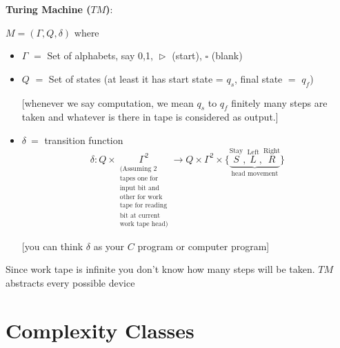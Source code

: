 \documentclass{report}
\begin{document}
\textbf{Turing Machine ($TM$)}: {$M=(\Gamma, Q,\delta)$ where \begin{itemize}
		\item $\Gamma$ $=$ Set of alphabets, say 0,1, $\vartriangleright$ (start), $\square$ (blank)
		\item $Q$ $=$ Set of states (at least it has start state = $q_s$, final state $=$ $q_f$)
		
		[whenever we say computation, we mean $q_s$ to $q_f$ finitely many steps are taken and whatever is there in tape is considered as output.]
		\item $\delta\ =$ transition function$$\delta : Q\times \underset{\substack{  (\text{Assuming 2}\\ \text{tapes one for} \\ \text{input bit and}\\ \text{other for work}\\ \text{tape for reading}\\ \text{bit at current}\\ \text{work tape head)} }}{\Gamma^2}\longrightarrow Q\times \Gamma^2\times \{\underbrace{\overset{\text{Stay}}{S},\overset{\text{Left}}{L},\overset{\text{Right}}{R}  }_{\text{head movement}} \}$$
		
		[you can think $\delta$ as your $C$ program or computer program]
\end{itemize}
\parinn

Since work tape is infinite you don't know how many steps will be taken. $TM$ abstracts every possible device

\section{Complexity Classes}

}
\end{document}
